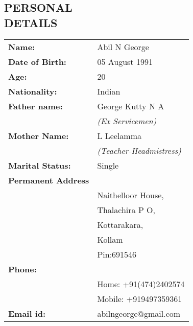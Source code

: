 \documentclass[line,margin]{res}
\begin{document}
\begin{resume}
    \section{PERSONAL \\ DETAILS}
    \begin{tabular}{ l l }
      {\bf Name:} &Abil N George\\
      {\bf Date of Birth:}&05 August 1991\\
      {\bf Age:} &20\\
      {\bf Nationality:}&Indian\\
      {\bf Father name:}&George Kutty N A \\
       &{\it (Ex Servicemen)}\\
      {\bf Mother Name:}&L Leelamma \\
       &{\it (Teacher-Headmistress)}\\
      {\bf Marital Status:} &Single\\
      {\bf Permanent Address}& \\
       &Naithelloor House,\\
       &Thalachira P O,\\
       &Kottarakara,\\
       &Kollam\\
       &Pin:691546\\
      {\bf Phone:}& \\
       &Home: +91(474)2402574\\
       &Mobile: +919497359361\\
      {\bf Email id:} &abilngeorge@gmail.com\\
    \end{tabular}
\end{resume}
\end{document}
